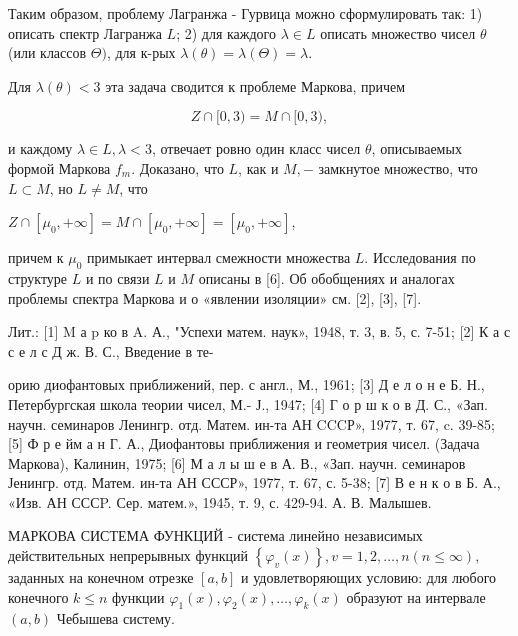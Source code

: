\documentclass[10pt]{article}
\begin{document}
Таким образом, проблему Лагранжа - Гурвица можно сформулировать так: 1) описать спектр Лагранжа $L$; 2) для каждого $\lambda \in L$ описать множество чисел $\theta$ (или классов $\Theta)$, для к-рых $\lambda(\theta)=\lambda(\Theta)=\lambda$.



Для $\lambda(\theta)<3$ эта задача сводится к проблеме Маркова, причем



\[

Z \cap[0,3)=M \cap[0,3),

\]



и каждому $\lambda \in L, \lambda<3$, отвечает ровно один класс чисел $\theta$, описываемых формой Маркова $f_{m}$. Доказано, что $L$, как и $M,-$ замкнутое множество, что $L \subset M$, но $L \neq M$, что



$Z \cap\left[\mu_{0},+\infty\right]=M \cap\left[\mu_{0},+\infty\right]=\left[\mu_{0},+\infty\right]$,



причем к $\mu_{0}$ примыкает интервал смежности множества $L$. Исследования по структуре $L$ и по связи $L$ и $M$ описаны в [6]. Об обобщениях и аналогах проблемы спектра Маркова и о «явлении изоляции» см. [2], [3], [7].



Лит.: [1] M а p ко в A. А., "Успехи матем. наук», 1948, т. 3, в. 5, с. 7-51; [2] К а с с е л с Д ж. В. С., Введение в те-

орию диофантовых приближений, пер. с англ., М., 1961; [3] Д е л о н е Б. Н., Петербургская школа теории чисел, М.- Ј., 1947; [4] Г о р ш к о в Д. С., «Зап. научн. семинаров Ленингр. отд. Матем. ин-та АН CCCР», 1977, т. 67, c. 39-85; [5] Ф р е йм а н Г. А., Диофантовы приближения и геометрия чисел. (Задача Маркова), Калинин, 1975; [6] М а л ы ш е в А. В., «Зап. научн. семинаров Јенингр. отд. Матем. ин-та АН СССР», 1977, т. 67, с. 5-38; [7] В е н к о в Б. А., «Изв. АН СССP. Сер. матем.», 1945, т. 9, с. 429-94. А. В. Малышев.



МАРКОВА СИСТЕМА ФУНКЦИЙ - система линейно независимых действительных непрерывных функций $\left\{\varphi_{v}(x)\right\}, v=1,2, \ldots, n(n \leqslant \infty)$, заданных на конечном отрезке $[a, b]$ и удовлетворяющих условию: для любого конечного $k \leqslant n$ функции $\varphi_{1}(x), \varphi_{2}(x), \ldots, \varphi_{k}(x)$ образуют на интервале $(a, b)$ Чебышева систему.
\end{document}
